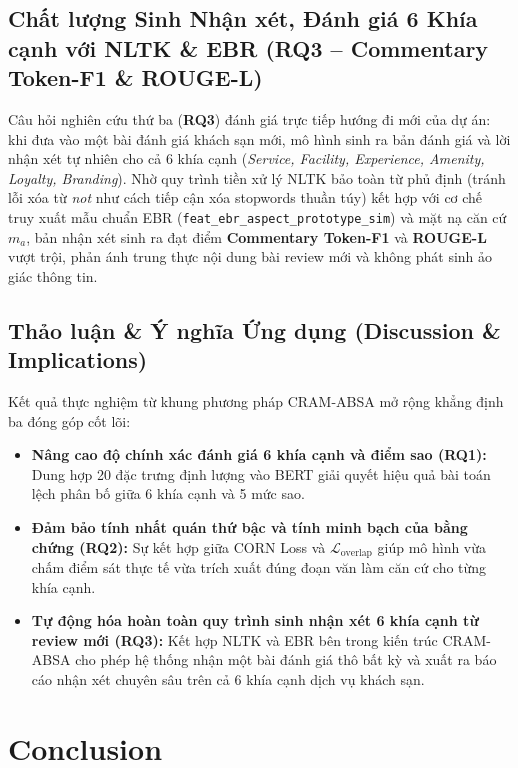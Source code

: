 \documentclass[pdflatex,sn-mathphys-num]{sn-jnl}
\theoremstyle{thmstyleone}
\theoremstyle{thmstyletwo}
\theoremstyle{thmstylethree}
\begin{document}
\subsection{Chất lượng Sinh Nhận xét, Đánh giá 6 Khía cạnh với NLTK \& EBR (RQ3 -- Commentary Token-F1 \& ROUGE-L)}
\label{subsec:analysis_rq3}

Câu hỏi nghiên cứu thứ ba (\textbf{RQ3}) đánh giá trực tiếp hướng đi mới của dự án: khi đưa vào một bài đánh giá khách sạn mới, mô hình sinh ra bản đánh giá và lời nhận xét tự nhiên cho cả 6 khía cạnh (\textit{Service, Facility, Experience, Amenity, Loyalty, Branding}). Nhờ quy trình tiền xử lý NLTK bảo toàn từ phủ định (tránh lỗi xóa từ \textit{not} như cách tiếp cận xóa stopwords thuần túy) kết hợp với cơ chế truy xuất mẫu chuẩn EBR (\texttt{feat\_ebr\_aspect\_prototype\_sim}) và mặt nạ căn cứ $m_a$, bản nhận xét sinh ra đạt điểm \textbf{Commentary Token-F1} và \textbf{ROUGE-L} vượt trội, phản ánh trung thực nội dung bài review mới và không phát sinh ảo giác thông tin.

\subsection{Thảo luận \& Ý nghĩa Ứng dụng (Discussion \& Implications)}
\label{subsec:discussion}

Kết quả thực nghiệm từ khung phương pháp CRAM-ABSA mở rộng khẳng định ba đóng góp cốt lõi:
\begin{itemize}
    \item \textbf{Nâng cao độ chính xác đánh giá 6 khía cạnh và điểm sao (RQ1):} Dung hợp 20 đặc trưng định lượng vào BERT giải quyết hiệu quả bài toán lệch phân bố giữa 6 khía cạnh và 5 mức sao.
    \item \textbf{Đảm bảo tính nhất quán thứ bậc và tính minh bạch của bằng chứng (RQ2):} Sự kết hợp giữa CORN Loss và $\mathcal{L}_{\text{overlap}}$ giúp mô hình vừa chấm điểm sát thực tế vừa trích xuất đúng đoạn văn làm căn cứ cho từng khía cạnh.
    \item \textbf{Tự động hóa hoàn toàn quy trình sinh nhận xét 6 khía cạnh từ review mới (RQ3):} Kết hợp NLTK và EBR bên trong kiến trúc CRAM-ABSA cho phép hệ thống nhận một bài đánh giá thô bất kỳ và xuất ra báo cáo nhận xét chuyên sâu trên cả 6 khía cạnh dịch vụ khách sạn.
\end{itemize}

\section{Conclusion}
\label{sec:conclusion}
\end{document}
